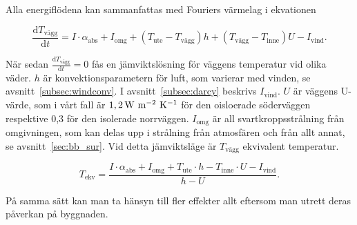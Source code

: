 Alla energiflödena kan sammanfattas med Fouriers värmelag i ekvationen 

\begin{equation}
\label{eq:walltemp}
\frac{\mathrm{d}T_\text{vägg}}{\mathrm{d}t} = 
I\cdot \alpha_\text{abs} + I_\text{omg} + (T_\text{ute} - T_\text{vägg}) h +( T_\text{vägg} - T_\text{inne} ) U - I_\text{vind}.
\end{equation}

När sedan $\frac{\mathrm{d}T_\text{vägg}}{\mathrm{d}t}=0$ fås en jämviktslösning för väggens temperatur vid olika väder. $h$ är konvektionsparametern för luft, som varierar med vinden, se avsnitt~\ref{subsec:windconv}. I avsnitt~\ref{subsec:darcy} beskrivs $I_\text{vind}$.
$U$ är väggens U-värde, som i vårt fall är $\unit[1,2]{W~m^{-2}~{K^{-1}}}$ för den oisloerade söderväggen respektive 0,3 för den isolerade norrväggen. $I_\text{omg}$ är all svartkroppsstrålning från omgivningen, som kan delas upp i strålning från atmosfären och från allt annat, se avsnitt~\ref{sec:bb_sur}. Vid detta jämviktsläge är $T_\text{vägg}$ ekvivalent temperatur.

\begin{equation}\boxed{ \; \; \;
\label{eq:ekvtemp}
T_\text{ekv} = 
\frac{I\cdot \alpha_\text{abs} + I_\text{omg} + T_\text{ute} \cdot h - T_\text{inne} \cdot U - I_\text{vind}}{h-U}.
\; \; \;}\end{equation}

På samma sätt kan man ta hänsyn till fler effekter allt eftersom man utrett deras påverkan på byggnaden.
